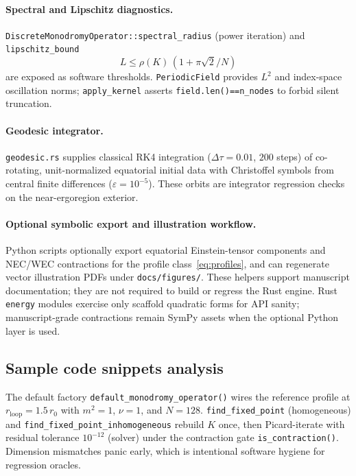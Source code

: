\documentclass[preprint,12pt,a4paper]{elsarticle}
\begin{document}
\paragraph{Spectral and Lipschitz diagnostics.}
\texttt{DiscreteMonodromyOperator::spectral\_radius} (power iteration) and \texttt{lipschitz\_bound}
\[
L\le\rho(K)\,(1+\pi\sqrt{2}/N)
\]
are exposed as software thresholds.
\texttt{PeriodicField} provides $L^{2}$ and index-space oscillation norms; \texttt{apply\_kernel} asserts \texttt{field.len()==n\_nodes} to forbid silent truncation.

\paragraph{Geodesic integrator.}
\texttt{geodesic.rs} supplies classical RK4 integration ($\Delta\tau=0.01$, $200$ steps) of co-rotating, unit-normalized equatorial initial data with Christoffel symbols from central finite differences ($\varepsilon=10^{-5}$).
These orbits are integrator regression checks on the near-ergoregion exterior.

\paragraph{Optional symbolic export and illustration workflow.}
Python scripts optionally export equatorial Einstein-tensor components and NEC/WEC contractions for the profile class~\eqref{eq:profiles}, and can regenerate vector illustration PDFs under \texttt{docs/figures/}.
These helpers support manuscript documentation; they are not required to build or regress the Rust engine.
Rust \texttt{energy} modules exercise only scaffold quadratic forms for API sanity; manuscript-grade contractions remain SymPy assets when the optional Python layer is used.

\subsection{Sample code snippets analysis}
\label{sec:snippets}

The default factory \texttt{default\_monodromy\_operator()} wires the reference profile at $r_{\mathrm{loop}}=1.5\,r_{0}$ with $m^{2}=1$, $\nu=1$, and $N=128$.
\texttt{find\_fixed\_point} (homogeneous) and \texttt{find\_fixed\_point\_inhomogeneous} rebuild $K$ once, then Picard-iterate with residual tolerance $10^{-12}$ (solver) under the contraction gate \texttt{is\_contraction()}.
Dimension mismatches panic early, which is intentional software hygiene for regression oracles.
\end{document}
